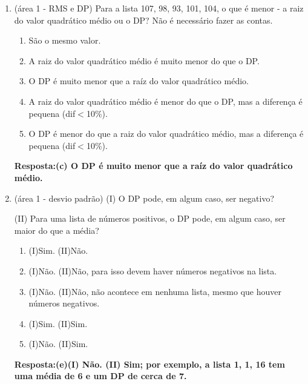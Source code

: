 \documentclass[12pt]{article}\documentclass[brazilian,12pt,a4paper,final]{article}
\begin{document}
\begin{enumerate}
\item (área 1 - RMS e DP) Para a lista 107, 98, 93, 101, 104, o que é menor - a raiz do valor quadrático médio ou o DP? Não é necessário fazer as contas.

\begin{enumerate}
    \item São o mesmo valor.
    \item A raiz do valor quadrático médio é muito menor do que o DP.
    \item O DP é muito menor que a raíz do valor quadrático médio.
    \item A raiz do valor quadrático médio é menor do que o DP, mas a diferença é pequena (dif$<$10\%).
    \item O DP é menor do que a raiz do valor quadrático médio, mas a diferença é pequena (dif$<$10\%).
\end{enumerate}

\textbf{Resposta:(c) O DP é muito menor que a raíz do valor quadrático médio.}

\item (área 1 - desvio padrão) (I) O DP pode, em algum caso, ser negativo?

(II) Para uma lista de números positivos, o DP pode, em algum caso, ser maior do que a média?

\begin{enumerate}
    \item (I)Sim. (II)Não.
    \item (I)Não. (II)Não, para isso devem haver números negativos na lista.
    \item (I)Não. (II)Não, não acontece em nenhuma lista, mesmo que houver números negativos.
    \item (I)Sim. (II)Sim.
    \item (I)Não. (II)Sim.
    
\end{enumerate}
\textbf{Resposta:(e)(I) Não.
(II) Sim; por exemplo, a lista 1, 1, 16 tem uma média de 6 e um DP de cerca de 7.}

\end{enumerate}
\end{document}
